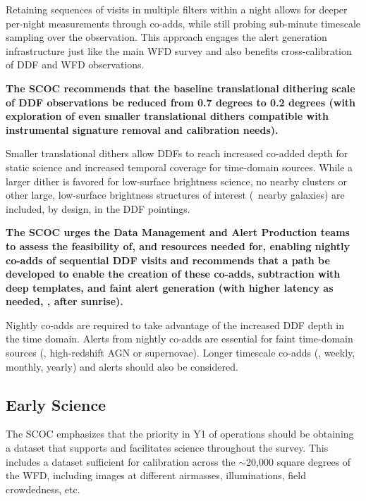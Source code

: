 Retaining sequences of visits in multiple filters within a night allows for deeper per-night measurements through co-adds, while still probing sub-minute timescale sampling over the observation. This approach engages the alert generation infrastructure just like the main WFD survey and also benefits cross-calibration of DDF and WFD observations. 

{\bf The SCOC recommends that the baseline translational dithering scale of DDF observations be reduced from 0.7 degrees to 0.2 degrees (with exploration of even smaller translational dithers compatible with instrumental signature removal and calibration needs).
}

Smaller translational dithers allow DDFs to reach increased co-added depth for static science and increased temporal coverage for time-domain sources. While a larger dither is favored for low-surface brightness science, no nearby clusters or other large, low-surface brightness structures of interest (\eg\, nearby galaxies) are included, by design, in the DDF pointings.



{\bf The SCOC urges the Data Management and Alert Production teams to assess the feasibility of, and resources needed for, enabling nightly co-adds of sequential DDF visits and recommends that a path be developed to enable the creation of these co-adds, subtraction with deep templates, and faint alert generation (with higher latency as needed, \eg , after sunrise). 
}

Nightly co-adds are required to take advantage of the increased DDF depth in the time domain. Alerts from nightly co-adds are essential for faint time-domain sources (\eg , high-redshift AGN or supernovae). Longer timescale co-adds (\eg , weekly, monthly, yearly) and alerts should also be considered.





\FloatBarrier

\subsection{Early Science}\label{sec:early}

 The SCOC emphasizes that the priority in Y1 of operations should be obtaining a dataset that supports and facilitates science throughout the survey. This includes a dataset sufficient for calibration across the \mbox{$\sim$20,000} square degrees of the WFD, including images at different airmasses, illuminations, field crowdedness, etc. 
 
